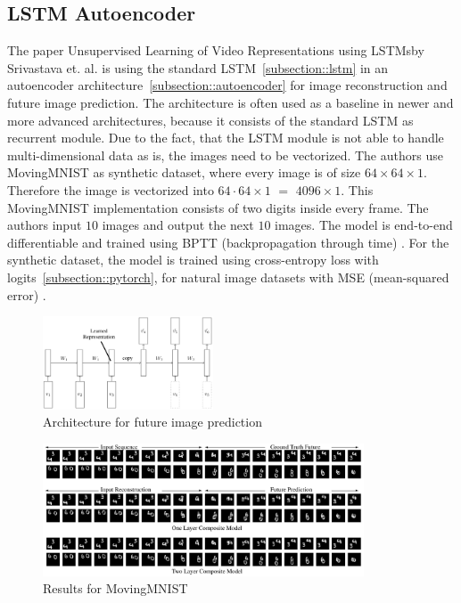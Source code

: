  \subsection{LSTM Autoencoder} \label{subsection::lstm_autoencoder}
  The paper \glqq Unsupervised Learning of Video Representations using LSTMs\grqq by Srivastava et. al. \cite{Srivastava2015} is using the standard LSTM~\ref{subsection::lstm} in an autoencoder
  architecture~\ref{subsection::autoencoder} for image reconstruction and future image prediction.
  The architecture is often used as a baseline in newer and more advanced architectures, because it consists of the standard LSTM as recurrent module.
  Due to the fact, that the LSTM module is not able to handle multi-dimensional data as is, the images need to be vectorized. The authors use
  MovingMNIST \cite{LeCun1998} as synthetic dataset, where every image is of size $64 \times 64 \times 1$. Therefore the image is vectorized into $64 \cdot 64 \times 1$ $=$ $4096 \times 1$.
  This MovingMNIST implementation consists of two digits inside every frame. The authors input $10$ images and output the next $10$ images.
  The model is end-to-end differentiable and trained using BPTT (backpropagation through time) \cite{Werbos1990}.
  For the synthetic dataset, the model is trained using cross-entropy loss with logits~\ref{subsection::pytorch}, for natural image
  datasets with MSE (mean-squared error) \cite{Zhao2017}.
  \begin{figure}[H]
   \includegraphics[width=0.45\textwidth]{../Images/srivastava.png}
   \centering
   \caption{Architecture for future image prediction \cite{Srivastava2015}}
   \label{fig:lstm_architecture}
  \end{figure}
  \begin{figure}[H]
   \includegraphics[width=0.85\textwidth]{../Images/srivastava_results_mnist.png}
   \centering
   \caption{Results for MovingMNIST \cite{Srivastava2015}}
   \label{fig:lstm_results}
  \end{figure}

